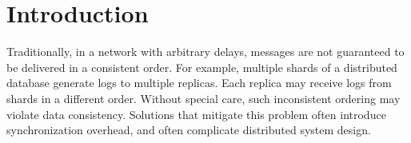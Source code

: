 \section{Introduction}
\label{sec:intro}

Traditionally, in a network with arbitrary delays, messages are not guaranteed to be delivered in a consistent order.
For example, multiple shards of a distributed database generate logs to multiple replicas.
Each replica may receive logs from shards in a different order.
Without special care, such inconsistent ordering may violate data consistency.
Solutions that mitigate this problem often introduce synchronization overhead, and often complicate distributed system design.



